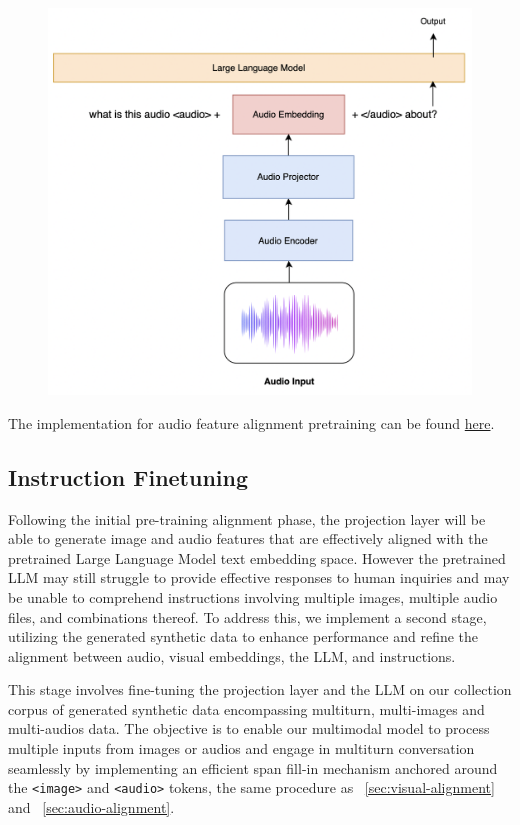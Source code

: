 \documentclass[preprint]{article}
\begin{document}
\begin{figure}[hbt!]
  \centering
  \includegraphics[width=0.6\linewidth]{pic/audio.png} %
\end{figure}

The implementation for audio feature alignment pretraining can be found \href{https://github.com/mesolitica/multimodal-LLM/tree/master/audio-only}{here}.

\subsection{Instruction Finetuning}

Following the initial pre-training alignment phase, the projection layer will be able to generate image and audio features that are effectively aligned with the pretrained Large Language Model text embedding space. However the pretrained LLM may still struggle to provide effective responses to human inquiries and may be unable to comprehend instructions involving multiple images, multiple audio files, and combinations thereof. To address this, we implement a second stage, utilizing the generated synthetic data to enhance performance and refine the alignment between audio, visual embeddings, the LLM, and instructions.

This stage involves fine-tuning the projection layer and the LLM on our collection corpus of generated synthetic data encompassing multiturn, multi-images and multi-audios data. The objective is to enable our multimodal model to process multiple inputs from images or audios and engage in multiturn conversation seamlessly by implementing an efficient span fill-in mechanism anchored around the \texttt{<image>} and \texttt{<audio>} tokens, the same procedure as ~\ref{sec:visual-alignment} and ~\ref{sec:audio-alignment}.
\end{document}
